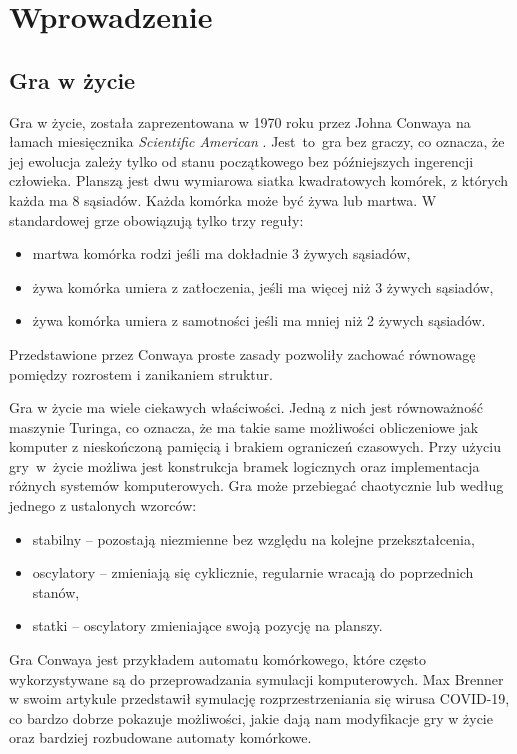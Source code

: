 \documentclass[declaration,shortabstract, inz]{iithesis}
\author         {Marcin Rogala}
\date          {25 grudnia 2020}
\theoremstyle{definition} \newtheorem{definition}{Definicja}[]
\theoremstyle{plain} \newtheorem{remark}[definition]{Obserwacja}
\theoremstyle{plain} \newtheorem{theorem}[definition]{Twierdzenie}
\theoremstyle{plain} \newtheorem{example}{Przykład}[definition]
\theoremstyle{plain} \newtheorem{lemma}[definition]{Lemat}
\begin{document}
\chapter{Wprowadzenie}
\section{Gra w życie}
Gra w życie, została zaprezentowana w 1970 roku przez Johna Conwaya na łamach miesięcznika \textit{Scientific American} \cite{gardner}.  Jest~to~gra bez graczy, co oznacza, że jej ewolucja zależy tylko od stanu początkowego bez późniejszych ingerencji człowieka. Planszą jest dwu wymiarowa siatka kwadratowych komórek, z których każda ma 8 sąsiadów. Każda komórka może być żywa lub martwa. W standardowej grze obowiązują tylko trzy reguły:

\begin{itemize}
\item martwa komórka rodzi jeśli ma dokładnie 3 żywych sąsiadów,
\item żywa komórka umiera z zatłoczenia, jeśli ma więcej niż 3 żywych sąsiadów,
\item żywa komórka umiera z samotności jeśli ma mniej niż 2 żywych sąsiadów.
\end{itemize}

Przedstawione przez Conwaya proste zasady pozwoliły zachować równowagę pomiędzy rozrostem i zanikaniem struktur.

Gra w życie ma wiele ciekawych właściwości. Jedną z nich jest równoważność maszynie Turinga, co oznacza, że ma takie same możliwości obliczeniowe jak komputer z nieskończoną pamięcią i brakiem ograniczeń czasowych. Przy użyciu gry~w~życie możliwa jest konstrukcja bramek logicznych oraz implementacja różnych systemów komputerowych. Gra może przebiegać chaotycznie lub według jednego z ustalonych wzorców: 
\begin{itemize}
	\item stabilny -- pozostają niezmienne bez względu na kolejne przekształcenia,
	\item oscylatory -- zmieniają się cyklicznie, regularnie wracają do poprzednich stanów,
	\item statki -- oscylatory zmieniające swoją pozycję na planszy.
\end{itemize}

Gra Conwaya jest przykładem automatu komórkowego, które często wykorzystywane są do przeprowadzania symulacji komputerowych. 
Max Brenner w swoim artykule \cite{brenner} przedstawił symulację rozprzestrzeniania się wirusa COVID-19, co bardzo dobrze pokazuje możliwości, jakie dają nam modyfikacje gry w życie oraz bardziej rozbudowane automaty komórkowe.
\end{document}
